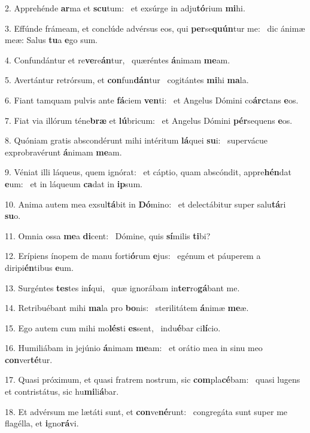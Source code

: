 2. Apprehénde \textbf{ar}ma et \textbf{scu}tum: \ast\  et exsúrge in adju\textbf{tó}rium \textbf{mi}hi.\

3. Effúnde frámeam, et conclúde advérsus eos, qui \textbf{per}se\textbf{quún}tur me: \ast\  dic ánimæ meæ: Salus \textbf{tu}a \textbf{e}go sum.\

4. Confundántur et re\textbf{ve}re\textbf{án}tur, \ast\  quæréntes \textbf{á}nimam \textbf{me}am.\

5. Avertántur retrórsum, et \textbf{con}fun\textbf{dán}tur \ast\  cogitántes \textbf{mi}hi \textbf{ma}la.\

6. Fiant tamquam pulvis ante \textbf{fá}ciem \textbf{ven}ti: \ast\  et Angelus Dómini co\textbf{árc}tans \textbf{e}os.\

7. Fiat via illórum téne\textbf{bræ} et \textbf{lú}bricum: \ast\  et Angelus Dómini \textbf{pér}sequens \textbf{e}os.\

8. Quóniam gratis abscondérunt mihi intéritum \textbf{lá}quei \textbf{su}i: \ast\  supervácue exprobravérunt \textbf{á}nimam \textbf{me}am.\

9. Véniat illi láqueus, quem ignórat: \dag\  et cáptio, quam abscóndit, appre\textbf{hén}dat \textbf{e}um: \ast\  et in láqueum \textbf{ca}dat in \textbf{ip}sum.\

10. Anima autem mea exsul\textbf{tá}bit in \textbf{Dó}mino: \ast\  et delectábitur super salu\textbf{tá}ri \textbf{su}o.\

11. Omnia ossa \textbf{me}a \textbf{di}cent: \ast\  Dómine, quis \textbf{sí}milis \textbf{ti}bi?\

12. Erípiens ínopem de manu forti\textbf{ó}rum \textbf{e}jus: \ast\  egénum et páuperem a diripi\textbf{én}tibus \textbf{e}um.\

13. Surgéntes \textbf{tes}tes in\textbf{í}qui, \ast\  quæ ignorábam in\textbf{ter}ro\textbf{gá}bant me.\

14. Retribuébant mihi \textbf{ma}la pro \textbf{bo}nis: \ast\  sterilitátem \textbf{á}nimæ \textbf{me}æ.\

15. Ego autem cum mihi mo\textbf{lés}ti \textbf{es}sent, \ast\  indu\textbf{é}bar ci\textbf{lí}cio.\

16. Humiliábam in jejúnio \textbf{á}nimam \textbf{me}am: \ast\  et orátio mea in sinu meo \textbf{con}ver\textbf{té}tur.\

17. Quasi próximum, et quasi fratrem nostrum, sic \textbf{com}pla\textbf{cé}bam: \ast\  quasi lugens et contristátus, sic hu\textbf{mi}li\textbf{á}bar.\

18. Et advérsum me lætáti sunt, et \textbf{con}ve\textbf{né}runt: \ast\  congregáta sunt super me flagélla, et \textbf{i}gno\textbf{rá}vi.\

